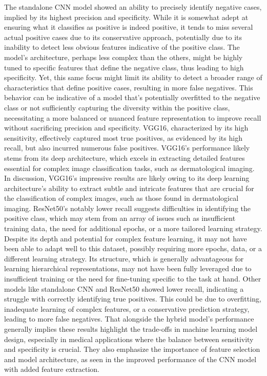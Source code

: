 \documentclass[10pt,twocolumn]{article}
\begin{document}
The standalone CNN model showed an ability to precisely identify negative cases, implied by its highest precision and specificity. While it is somewhat adept at ensuring what it classifies as positive is indeed positive, it tends to miss several actual positive cases due to its conservative approach, potentially due to its inability to detect less obvious features indicative of the positive class. The model's architecture, perhaps less complex than the others, might be highly tuned to specific features that define the negative class, thus leading to high specificity. Yet, this same focus might limit its ability to detect a broader range of characteristics that define positive cases, resulting in more false negatives. This behavior can be indicative of a model that's potentially overfitted to the negative class or not sufficiently capturing the diversity within the positive class, necessitating a more balanced or nuanced feature representation to improve recall without sacrificing precision and specificity. \newline
VGG16, characterized by its high sensitivity, effectively captured most true positives, as evidenced by its high recall, but also incurred numerous false positives. VGG16's performance likely stems from its deep architecture, which excels in extracting detailed features essential for complex image classification tasks, such as dermatological imaging. In discussion, VGG16's impressive results are likely owing to its deep learning architecture's ability to extract subtle and intricate features that are crucial for the classification of complex images, such as those found in dermatological imaging. \newline
ResNet50's notably lower recall suggests difficulties in identifying the positive class, which may stem from an array of issues such as insufficient training data, the need for additional epochs, or a more tailored learning strategy. Despite its depth and potential for complex feature learning, it may not have been able to adapt well to this dataset, possibly requiring more epochs, data, or a different learning strategy. Its structure, which is generally advantageous for learning hierarchical representations, may not have been fully leveraged due to insufficient training or the need for fine-tuning specific to the task at hand. \newline
Other models like standalone CNN and ResNet50 showed lower recall, indicating a struggle with correctly identifying true positives. This could be due to overfitting, inadequate learning of complex features, or a conservative prediction strategy, leading to more false negatives. That alongside the hybrid model’s performance generally implies these results highlight the trade-offs in machine learning model design, especially in medical applications where the balance between sensitivity and specificity is crucial. They also emphasize the importance of feature selection and model architecture, as seen in the improved performance of the CNN model with added feature extraction. \newline
\end{document}
